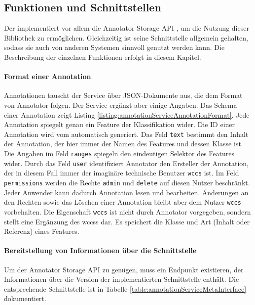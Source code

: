 \subsection{Funktionen und Schnittstellen}
    \label{section:solutionDetailsAnnotationServiceFunctions}
    Der {\annotationService} implementiert vor allem die
    Annotator Storage API \cite[Kapitel "`Storage"']{annotator:documentation},
    um die Nutzung dieser Bibliothek zu ermöglichen.
    Gleichzeitig ist seine Schnittstelle allgemein gehalten,
    sodass sie auch von anderen Systemen sinnvoll genutzt werden kann.
    Die Beschreibung der einzelnen Funktionen erfolgt in diesem Kapitel.

    \paragraph{Format einer Annotation}
    Annotationen tauscht der Service über JSON-Dokumente aus,
    die dem Format von Annotator \cite[Kapitel "`Annotation format"' ]{annotator:documentation} folgen.
    Der Service ergänzt aber einige Angaben.
    Das Schema einer Annotation zeigt Listing \ref{listing:annotationServiceAnnotationFormat}.
    Jede Annotation spiegelt genau ein Feature der Klassifikation wider.
    Die ID einer Annotation wird vom {\annotationService} automatisch
    generiert.
    Das Feld \texttt{text} bestimmt den Inhalt der Annotation,
    der hier immer der Namen des Features und dessen Klasse ist.
    Die Angaben im Feld \texttt{ranges} spiegeln den eindeutigen Selektor des Features wider.
    Durch das Feld \texttt{user} identifiziert Annotator den Ersteller der Annotation,
    der in diesem Fall immer der imaginäre technische Benutzer \texttt{wccs} ist.
    Im Feld \texttt{permissions} werden die Rechte \texttt{admin} und \texttt{delete} auf diesen Nutzer beschränkt.
    Jeder Anwender kann dadurch Annotation lesen und bearbeiten.
    Änderungen an den Rechten sowie das Löschen einer Annotation bleibt aber dem Nutzer \texttt{wccs} vorbehalten.
    Die Eigenschaft \texttt{wccs} ist nicht durch Annotator vorgegeben,
    sondern stellt eine Ergänzung des \glspl{wccs} dar.
    Es speichert die Klasse und Art (Inhalt oder Referenz) eines Features.

    

    \paragraph{Bereitstellung von Informationen über die Schnittstelle}
    Um der Annotator Storage API \cite[Kapitel "`Storage"' ]{annotator:documentation} zu genügen,
    muss ein Endpunkt existieren,
    der Informationen über die Version der implementierten Schnittstelle
    enthält.
    Die entsprechende Schnittstelle ist in Tabelle
    \ref{table:annotationServiceMetaInterface} dokumentiert.


